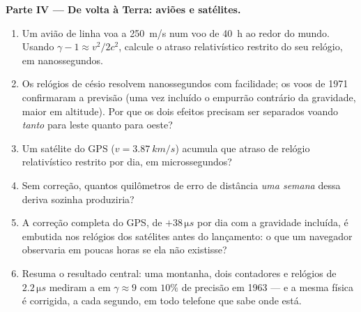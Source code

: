 \begin{problem}
\medskip\noindent\textbf{Parte IV --- De volta à Terra: aviões e
satélites.}
\begin{enumerate}[resume]
  \item Um avião de linha voa a \qty{250}{m/s} num voo de
        \qty{40}{h} ao redor do mundo. Usando
        $\gamma - 1 \approx v^2/2c^2$, calcule o atraso
        relativístico restrito do seu relógio, em nanossegundos.
  \item Os relógios de césio resolvem nanossegundos com facilidade; os
        voos de 1971 confirmaram a previsão (uma vez incluído o
        empurrão contrário da gravidade, maior em altitude). Por que os
        dois efeitos precisam ser separados voando \emph{tanto} para
        leste quanto para oeste?
  \item Um satélite do GPS ($v = \qty{3.87}{km/s}$) acumula que atraso
        de relógio relativístico restrito por dia, em microssegundos?
  \item Sem correção, quantos quilômetros de erro de distância
        \emph{uma semana} dessa deriva sozinha produziria?
  \item A correção completa do GPS, de $+38\,\unit{\micro s}$ por dia
        com a gravidade incluída, é embutida nos relógios dos
        satélites antes do lançamento: o que um navegador observaria
        em poucas horas se ela não existisse?
  \item Resuma o resultado central: uma montanha, dois contadores e
        relógios de $2.2\,\unit{\micro s}$ mediram a  em $\gamma \approx 9$ com $10\%$ de precisão em 1963 ---
        e a mesma física é corrigida, a cada segundo, em todo telefone
        que sabe onde está.
\end{enumerate}
\end{problem}
